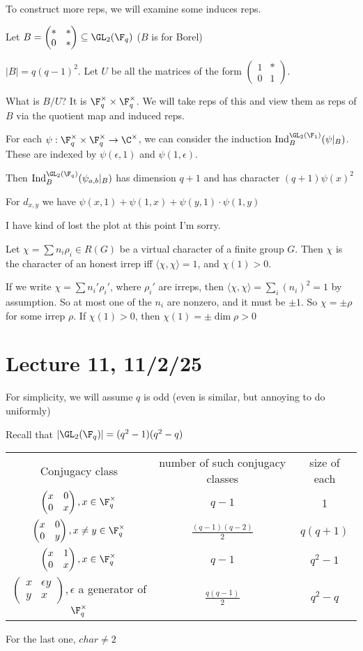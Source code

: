 \documentclass[x11names,reqno,14pt]{extarticle}
\newcommand{\pmat}[4]{\begin{pmatrix} #1 & #2 \\ #3 & #4 \end{pmatrix}}
\DeclareMathOperator{\Ind}{Ind}
\begin{document}
To construct more reps, we will examine some induces reps. 


Let $B = \pmat{*}{*}{0}{*} \subseteq \GL_2(\F_q)$ ($B$ is for Borel)

$|B| = q(q-1)^2$. Let $U$ be all the matrices of the form $\pmat{1}{*}{0}{1}$. 

What is $B/U$? It is $\F_q^\times \times \F_q^\times$. We will take reps of this and view them as reps of $B$ via the quotient map and induced reps. 

For each $\psi:\F_q^\times\times\F_q^\times\to\C^\times$, we can consider the induction $\Ind_B^{\GL_2(\F_1)}(\psi|_B)$. These are indexed by $\psi(\epsilon,1)$ and $\psi(1,\epsilon)$. 

Then $\Ind_B^{\GL_2(\F_q)}(\psi_{a,b}|_B)$ has dimension $q+1$ and has character $(q+1)\psi(x)^2$

For $d_{x, y}$ we have $\psi(x,1)+\psi(1,x) + \psi(y,1) \cdot \psi(1,y)$

I have kind of lost the plot at this point I'm sorry.

\prop

Let $\chi = \sum n_i \rho_i \in R(G)$ be a virtual character of a finite group $G$. Then $\chi$ is the character of an honest irrep iff $\langle\chi,\chi\rangle = 1$, and $\chi(1)>0$. 

\proof

If we write $\chi = \sum n_i' \rho_i'$, where $\rho_i'$ are irreps, then $\langle\chi,\chi\rangle = \sum_i(n_i)^2 = 1$ by assumption. So at most one of the $n_i$ are nonzero, and it must be $\pm 1$. So $\chi = \pm\rho$ for some irrep $\rho$. If $\chi(1)>0$, then $\chi(1)= \pm\dim\rho>0$


\section*{Lecture 11, 11/2/25}

For simplicity, we will assume $q$ is odd (even is similar, but annoying to do uniformly)

Recall that $|\GL_2(\F_q)| = (q^2-1)(q^2-q)$

\begin{center}
\begin{tabular}{c | c | c}
Conjugacy class & number of such conjugacy classes & size of each \\
$\pmat{x}{0}{0}{x}, x \in \F_q^\times$ & $q- 1$ & 1 \\
$\pmat{x}{0}{0}{y}, x \neq y\in \F_q^\times$ & $\frac{(q-1)(q-2)}{2}$ & $q(q+1)$\\
$\pmat{x}{1}{0}{x}, x \in \F_q^\times$ & $q-1$ & $q^2 - 1$ \\
$\pmat{x}{\epsilon y}{y}{x},\epsilon$ a generator of $\F_q^\times$ & $\frac{q(q-1)}{2}$ & $q^2 - q$ \\
\end{tabular}
\end{center}
For the last one, $char\neq2$
\end{document}
